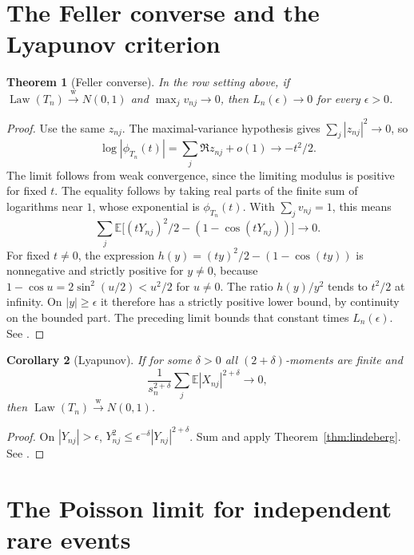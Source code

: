 \documentclass[11pt,oneside,openany]{book}
\newcommand{\E}{\mathbb{E}}
\DeclareMathOperator{\Law}{Law}
\newcommand{\weakto}{\xrightarrow{\mathrm{w}}}
\theoremstyle{plain}
\newtheorem{theorem}{Theorem}[chapter]
\newtheorem{corollary}[theorem]{Corollary}
\theoremstyle{definition}
\theoremstyle{remark}
\begin{document}
\section{The Feller converse and the Lyapunov criterion}
\label{p09-03}

\begin{theorem}[Feller converse]\label{thm:feller}
In the row setting above, if \(\Law(T_n)\weakto N(0,1)\) and
\(\max_j v_{nj}\to0\), then \(L_n(\epsilon)\to0\) for every
\(\epsilon>0\).
\end{theorem}

\begin{proof}
Use the same \(z_{nj}\). The maximal-variance hypothesis gives
\(\sum_j|z_{nj}|^2\to0\), so
\[
 \log|\phi_{T_n}(t)|=\sum_j\Re z_{nj}+o(1)
 \longrightarrow -t^2/2 .
\]
The limit follows from weak convergence, since the limiting modulus is
positive for fixed \(t\). The equality follows by taking real parts
of the finite sum of logarithms near \(1\), whose exponential is
\(\phi_{T_n}(t)\). With \(\sum_jv_{nj}=1\), this means
\[
 \sum_j \E\big[(tY_{nj})^2/2-(1-\cos(tY_{nj}))\big]\longrightarrow0 .
\]
For fixed \(t\ne0\), the expression \(h(y)=(ty)^2/2-(1-\cos(ty))\)
is nonnegative and strictly positive for \(y\ne0\), because
\(1-\cos u=2\sin^2(u/2)<u^2/2\) for \(u\ne0\).
The ratio \(h(y)/y^2\) tends to \(t^2/2\) at infinity. On
\(|y|\ge\epsilon\) it therefore has a strictly positive lower bound,
by continuity on the bounded part. The preceding limit bounds
that constant times \(L_n(\epsilon)\).
See \cite[Theorem 6.13]{Kallenberg}.
\end{proof}

\begin{corollary}[Lyapunov]\label{cor:lyapunov}
If for some \(\delta>0\) all \((2+\delta)\)-moments are finite and
\[
 \frac{1}{s_n^{2+\delta}}\sum_j \E|X_{nj}|^{2+\delta}\longrightarrow0,
\]
then \(\Law(T_n)\weakto N(0,1)\).
\end{corollary}
\begin{proof}
On \(|Y_{nj}|>\epsilon\),
\(Y_{nj}^2\le \epsilon^{-\delta}|Y_{nj}|^{2+\delta}\).
Sum and apply Theorem~\ref{thm:lindeberg}.
See \cite[Exercise 3.4.12, p.\ 152]{Durrett}.
\end{proof}

\section{The Poisson limit for independent rare events}
\label{p09-04}
\end{document}
